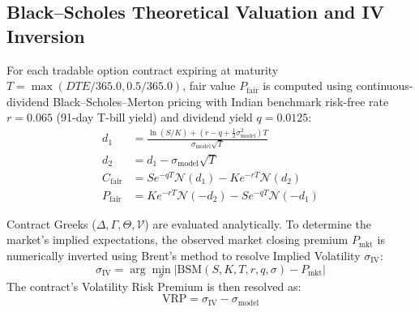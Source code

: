 \documentclass[journal]{IEEEtran}
\begin{document}
\subsection{Black--Scholes Theoretical Valuation and IV Inversion}
For each tradable option contract expiring at maturity $T = \max(DTE/365.0, 0.5/365.0)$, fair value $P_{\mathrm{fair}}$ is computed using continuous-dividend Black--Scholes--Merton pricing with Indian benchmark risk-free rate $r=0.065$ (91-day T-bill yield) and dividend yield $q=0.0125$:
\begin{equation}
\begin{aligned}
d_1 &= \frac{\ln(S/K) + (r - q + \frac{1}{2}\sigma_{\mathrm{model}}^2)T}{\sigma_{\mathrm{model}}\sqrt{T}} \\
d_2 &= d_1 - \sigma_{\mathrm{model}}\sqrt{T} \\
C_{\mathrm{fair}} &= S e^{-q T} \mathcal{N}(d_1) - K e^{-r T} \mathcal{N}(d_2) \\
P_{\mathrm{fair}} &= K e^{-r T} \mathcal{N}(-d_2) - S e^{-q T} \mathcal{N}(-d_1)
\end{aligned}
\end{equation}

Contract Greeks ($\Delta, \Gamma, \Theta, \mathcal{V}$) are evaluated analytically. To determine the market's implied expectations, the observed market closing premium $P_{\mathrm{mkt}}$ is numerically inverted using Brent's method to resolve Implied Volatility $\sigma_{\mathrm{IV}}$:
\begin{equation}
\sigma_{\mathrm{IV}} = \arg\min_{\sigma} \left| \mathrm{BSM}(S, K, T, r, q, \sigma) - P_{\mathrm{mkt}} \right|
\end{equation}
The contract's Volatility Risk Premium is then resolved as:
\begin{equation}
\mathrm{VRP} = \sigma_{\mathrm{IV}} - \sigma_{\mathrm{model}}
\end{equation}
\end{document}
